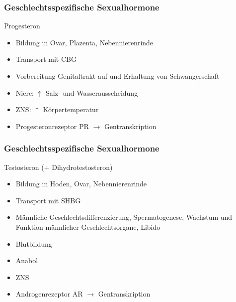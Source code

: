 \documentclass{beamer}
\begin{document}
\begin{frame}
\frametitle{Geschlechtsspezifische Sexualhormone}

\begin{block}{Progesteron}
\begin{itemize}
\item
Bildung in Ovar, Plazenta, Nebennierenrinde
\item
Transport mit CBG
\item
Vorbereitung Genitaltrakt auf und Erhaltung von Schwangerschaft
\item
Niere: \(\uparrow\) Salz- und Wasserausscheidung
\item
ZNS: \(\uparrow\) Körpertemperatur
\item
Progesteronrezeptor PR \(\rightarrow\) Gentranskription
\end{itemize}
\end{block}

\end{frame}

\begin{frame}
 \frametitle{Geschlechtsspezifische Sexualhormone}



\begin{block}{Testosteron (+ Dihydrotestosteron)}
\begin{itemize}
\item
Bildung in Hoden, Ovar, Nebennierenrinde
\item
Transport mit SHBG
\item
 Männliche Geschlechtsdifferenzierung, Spermatogenese, Wachstum und Funktion männlicher Geschlechtsorgane, Libido
\item
Blutbildung
\item
Anabol
\item
ZNS
\item
 Androgenrezeptor AR \(\rightarrow\) Gentranskription
\end{itemize}
\end{block}
\end{frame}
\end{document}

